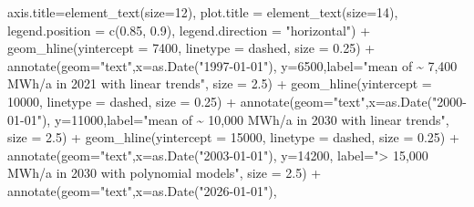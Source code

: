 \documentclass[a4paper,11pt]{article}
\newenvironment{Shaded}{\begin{snugshade}}{\end{snugshade}}
\newcommand{\AttributeTok}[1]{\textcolor[rgb]{0.77,0.63,0.00}{#1}}
\newcommand{\DecValTok}[1]{\textcolor[rgb]{0.00,0.00,0.81}{#1}}
\newcommand{\FloatTok}[1]{\textcolor[rgb]{0.00,0.00,0.81}{#1}}
\newcommand{\FunctionTok}[1]{\textcolor[rgb]{0.00,0.00,0.00}{#1}}
\newcommand{\NormalTok}[1]{#1}
\newcommand{\SpecialCharTok}[1]{\textcolor[rgb]{0.00,0.00,0.00}{#1}}
\newcommand{\StringTok}[1]{\textcolor[rgb]{0.31,0.60,0.02}{#1}}
\begin{document}
\begin{Shaded}
\begin{Highlighting}[]
         \AttributeTok{axis.title=}\FunctionTok{element\_text}\NormalTok{(}\AttributeTok{size=}\DecValTok{12}\NormalTok{),}
         \AttributeTok{plot.title =} \FunctionTok{element\_text}\NormalTok{(}\AttributeTok{size=}\DecValTok{14}\NormalTok{),}
         \AttributeTok{legend.position =} \FunctionTok{c}\NormalTok{(}\FloatTok{0.85}\NormalTok{, }\FloatTok{0.9}\NormalTok{),}
         \AttributeTok{legend.direction =} \StringTok{"horizontal"}\NormalTok{) }\SpecialCharTok{+}
  \FunctionTok{geom\_hline}\NormalTok{(}\AttributeTok{yintercept =} \DecValTok{7400}\NormalTok{, }\AttributeTok{linetype =} \StringTok{\textquotesingle{}dashed\textquotesingle{}}\NormalTok{, }\AttributeTok{size =} \FloatTok{0.25}\NormalTok{) }\SpecialCharTok{+}
  \FunctionTok{annotate}\NormalTok{(}\AttributeTok{geom=}\StringTok{"text"}\NormalTok{,}\AttributeTok{x=}\FunctionTok{as.Date}\NormalTok{(}\StringTok{"1997{-}01{-}01"}\NormalTok{),}
           \AttributeTok{y=}\DecValTok{6500}\NormalTok{,}\AttributeTok{label=}\StringTok{"mean of \textasciitilde{} 7,400 MWh/a in 2021 with linear trends"}\NormalTok{,}
           \AttributeTok{size =} \FloatTok{2.5}\NormalTok{) }\SpecialCharTok{+}
  \FunctionTok{geom\_hline}\NormalTok{(}\AttributeTok{yintercept =} \DecValTok{10000}\NormalTok{, }\AttributeTok{linetype =} \StringTok{\textquotesingle{}dashed\textquotesingle{}}\NormalTok{, }\AttributeTok{size =} \FloatTok{0.25}\NormalTok{) }\SpecialCharTok{+}
  \FunctionTok{annotate}\NormalTok{(}\AttributeTok{geom=}\StringTok{"text"}\NormalTok{,}\AttributeTok{x=}\FunctionTok{as.Date}\NormalTok{(}\StringTok{"2000{-}01{-}01"}\NormalTok{),}
           \AttributeTok{y=}\DecValTok{11000}\NormalTok{,}\AttributeTok{label=}\StringTok{"mean of \textasciitilde{} 10,000 MWh/a in 2030 with linear trends"}\NormalTok{, }
           \AttributeTok{size =} \FloatTok{2.5}\NormalTok{) }\SpecialCharTok{+}
  \FunctionTok{geom\_hline}\NormalTok{(}\AttributeTok{yintercept =} \DecValTok{15000}\NormalTok{, }\AttributeTok{linetype =} \StringTok{\textquotesingle{}dashed\textquotesingle{}}\NormalTok{, }\AttributeTok{size =} \FloatTok{0.25}\NormalTok{) }\SpecialCharTok{+}
  \FunctionTok{annotate}\NormalTok{(}\AttributeTok{geom=}\StringTok{"text"}\NormalTok{,}\AttributeTok{x=}\FunctionTok{as.Date}\NormalTok{(}\StringTok{"2003{-}01{-}01"}\NormalTok{),}
           \AttributeTok{y=}\DecValTok{14200}\NormalTok{, }\AttributeTok{label=}\StringTok{"\textgreater{} 15,000 MWh/a in 2030 with polynomial models"}\NormalTok{, }
           \AttributeTok{size =} \FloatTok{2.5}\NormalTok{) }\SpecialCharTok{+}
  \FunctionTok{annotate}\NormalTok{(}\AttributeTok{geom=}\StringTok{"text"}\NormalTok{,}\AttributeTok{x=}\FunctionTok{as.Date}\NormalTok{(}\StringTok{"2026{-}01{-}01"}\NormalTok{),}

\end{Highlighting}
\end{Shaded}
\end{document}
